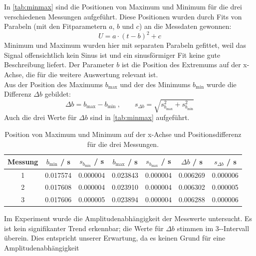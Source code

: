 In \autoref{tab:minmax} sind die Positionen von Maximum und Minimum für die drei verschiedenen Messungen aufgeführt.
Diese Positionen wurden durch Fits von Parabeln (mit den Fitparametern $a$, $b$ und $c$) an die Messdaten gewonnen:
\begin{equation}
  U = a \cdot (t-b)^2 + c
\end{equation}
Minimum und Maximum wurden hier mit separaten Parabeln gefittet,
weil das Signal offensichtlich kein Sinus ist und ein sinusförmiger Fit keine gute Beschreibung liefert.
Der Parameter $b$ ist die Position des Extremums auf der x-Achse, die für die weitere Auswertung relevant ist.\\
Aus der Position des Maximums $b_{\text{max}}$ und der des Minimums $b_{\text{min}}$
wurde die Differenz $\Delta b$ gebildet:
\begin{equation}
  \Delta b = b_{\text{max}} - b_{\text{min}} \ , \qquad s_{\Delta b} = \sqrt{s_{b_{\text{max}}}^2 + s_{b_{\text{min}}}^2}
\end{equation}
Auch die drei Werte für $\Delta b$ sind in \autoref{tab:minmax} aufgeführt.
\begin{table}[H]
\caption{Position von Maximum und Minimum auf der x-Achse und Positionsdifferenz für die
drei Messungen.}
\begin{center}
\begin{tabular}{|c|c|c|c|c|c|c|}
  \hline
 Messung		& $b_{\text{min}}$ / s 	& $s_{b_{\text{min}}}$ / s 	& $b_{\text{max}}$ / s 	& $s_{b_{\text{max}}}$ / s 	& $\Delta b$ / s 	& $s_{\Delta b}$ / s \\ \hline  
 1 				& 0.017574      		& 0.000004     				& 0.023843   			& 0.000004        			& 0.006269   		& 0.000006       \\ \hline  
 2   		  	& 0.017608       		& 0.000004     				& 0.023910     			& 0.000004        			& 0.006302      	& 0.000005       \\ \hline  
 3 	    		& 0.017606       		& 0.000005     				& 0.023894    			& 0.000004       			& 0.006288    		& 0.000006      \\ \hline   
 
\end{tabular}
\end{center}
\label{tab:minmax}
\end{table}
Im Experiment wurde die Amplitudenabhängigkeit der Messwerte untersucht.
Es ist kein signifikanter Trend erkennbar; die Werte für $\Delta b$ stimmen im 3-\textsigma -Intervall
überein. Dies entspricht unserer Erwartung, da es keinen Grund für eine Amplitudenabhängigkeit
